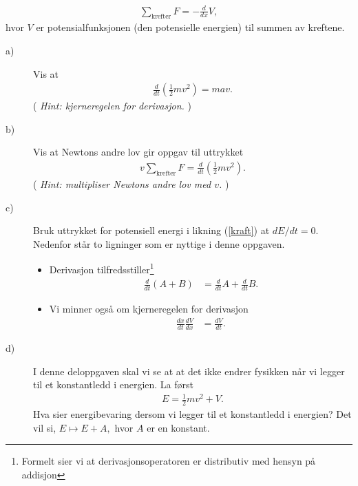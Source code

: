 \documentclass[a4paper, norsk, 12pt]{article}
\newcommand{\EQU}[1] { \begin{equation*} \begin{split}
#1  
\end{split} \end{equation*} }
\begin{document}
\begin{align}
\sum_{\textrm{krefter}} F = -\frac{d}{dx}V, \label{kraft}
\end{align}
hvor $V$ er potensialfunksjonen (den potensielle energien) til summen av kreftene.

\begin{description}

\item[a)] Vis at \EQU{\frac{d}{dt}\left( \frac{1}{2}mv^2 \right) = mav. }
(\textit{ \footnotesize Hint: kjerneregelen for derivasjon. } )

\item[b)] Vis at Newtons andre lov gir oppgav til uttrykket
\EQU{ v\sum_{\textrm{krefter}} F = \frac{d}{dt}\left( \frac{1}{2}mv^2 \right). }
(\textit{ \footnotesize Hint: multipliser Newtons andre lov med $v$. })


\item[c)] Bruk uttrykket for potensiell energi i likning (\ref{kraft}) at $dE/dt = 0$. Nedenfor står to ligninger som er nyttige i denne oppgaven.

\begin{itemize}
\item Derivasjon tilfredsstiller\footnote{Formelt sier vi at derivasjonsoperatoren er distributiv med hensyn på addisjon} \EQU{\frac{d}{dt}\left(A + B \right) &= \frac{d}{dt} A + \frac{d}{dt} B.}
\item Vi minner også om kjerneregelen for derivasjon \EQU{\frac{dx}{dt}\frac{dV}{dx} &= \frac{dV}{dt}.}
\end{itemize}


\item[d)] I denne deloppgaven skal vi se at at det ikke endrer fysikken når vi legger til et konstantledd i energien. La først
\EQU{ E = \frac{1}{2}mv^2 + V. }
Hva sier energibevaring dersom vi legger til et konstantledd i energien? Det vil si, $E \mapsto E + A,$ hvor $A$ er en konstant.
\end{description}
  
  
\end{document}
